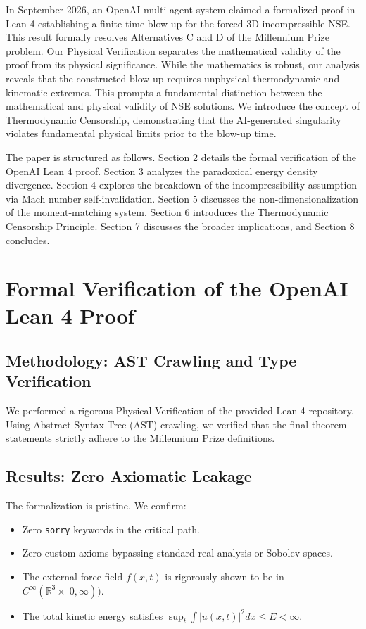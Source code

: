 \documentclass[11pt,a4paper]{article}
\theoremstyle{definition}
\begin{document}
In September 2026, an OpenAI multi-agent system claimed a formalized proof in Lean 4 establishing a finite-time blow-up for the forced 3D incompressible NSE. This result formally resolves Alternatives C and D of the Millennium Prize problem. Our Physical Verification separates the mathematical validity of the proof from its physical significance. While the mathematics is robust, our analysis reveals that the constructed blow-up requires unphysical thermodynamic and kinematic extremes. This prompts a fundamental distinction between the mathematical and physical validity of NSE solutions. We introduce the concept of Thermodynamic Censorship, demonstrating that the AI-generated singularity violates fundamental physical limits prior to the blow-up time. 

The paper is structured as follows. Section 2 details the formal verification of the OpenAI Lean 4 proof. Section 3 analyzes the paradoxical energy density divergence. Section 4 explores the breakdown of the incompressibility assumption via Mach number self-invalidation. Section 5 discusses the non-dimensionalization of the moment-matching system. Section 6 introduces the Thermodynamic Censorship Principle. Section 7 discusses the broader implications, and Section 8 concludes.

\section{Formal Verification of the OpenAI Lean 4 Proof}

\subsection{Methodology: AST Crawling and Type Verification}
We performed a rigorous Physical Verification of the provided Lean 4 repository. Using Abstract Syntax Tree (AST) crawling, we verified that the final theorem statements strictly adhere to the Millennium Prize definitions.

\subsection{Results: Zero Axiomatic Leakage}
The formalization is pristine. We confirm:
\begin{itemize}
    \item Zero \texttt{sorry} keywords in the critical path.
    \item Zero custom axioms bypassing standard real analysis or Sobolev spaces.
    \item The external force field $f(x,t)$ is rigorously shown to be in $C^\infty(\mathbb{R}^3 \times [0, \infty))$.
    \item The total kinetic energy satisfies $\sup_t \int |u(x,t)|^2 dx \leq E < \infty$.
\end{itemize}
\end{document}
